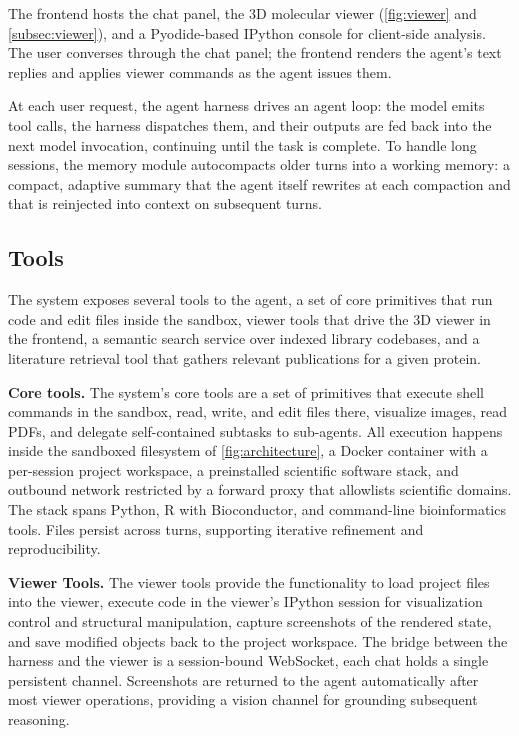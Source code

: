 \documentclass[journal=jcisd8,manuscript=article]{achemso}
\begin{document}
The frontend hosts the chat panel, the 3D molecular viewer (\cref{fig:viewer} and \cref{subsec:viewer}), and a Pyodide-based IPython console for client-side analysis. The user converses through the chat panel; the frontend renders the agent's text replies and applies viewer commands as the agent issues them.

At each user request, the agent harness drives an agent loop: the model emits tool calls, the harness dispatches them, and their outputs are fed back into the next model invocation, continuing until the task is complete. To handle long sessions, the memory module autocompacts older turns into a working memory: a compact, adaptive summary that the agent itself rewrites at each compaction and that is reinjected into context on subsequent turns.


\subsection{Tools}\label{sec:tools}

The system exposes several tools to the agent, a set of core primitives that run code and edit files inside the sandbox, viewer tools that drive the 3D viewer in the frontend, a semantic search service over indexed library codebases, and a literature retrieval tool that gathers relevant publications for a given protein.

\noindent\textbf{Core tools.} The system's core tools are a set of primitives that execute shell commands in the sandbox, read, write, and edit files there, visualize images, read PDFs, and delegate self-contained subtasks to sub-agents. All execution happens inside the sandboxed filesystem of \cref{fig:architecture}, a Docker container with a per-session project workspace, a preinstalled scientific software stack, and outbound network restricted by a forward proxy that allowlists scientific domains. The stack spans Python, R with Bioconductor, and command-line bioinformatics tools. Files persist across turns, supporting iterative refinement and reproducibility.

\noindent\textbf{Viewer Tools.} The viewer tools provide the functionality to load project files into the viewer, execute code in the viewer's IPython session for visualization control and structural manipulation, capture screenshots of the rendered state, and save modified objects back to the project workspace. The bridge between the harness and the viewer is a session-bound WebSocket, each chat holds a single persistent channel. Screenshots are returned to the agent automatically after most viewer operations, providing a vision channel for grounding subsequent reasoning.
\end{document}

